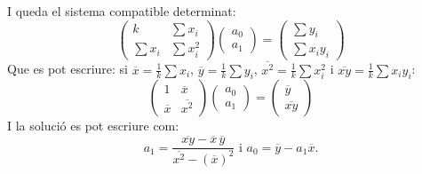 I queda el sistema compatible determinat:
\[
\begin{pmatrix}
k & \sum x_i \\ \sum x_i & \sum x_i^2 
\end{pmatrix}
\begin{pmatrix} a_0 \\ a_1 \end{pmatrix} = 
\begin{pmatrix} \sum y_i \\ \sum x_iy_i \end{pmatrix}
\]
Que es pot escriure: si $\overline x = \frac{1}{k} \sum x_i$, $\overline y=\frac{1}{k} \sum y_i$, $\overline {x^2}= \frac{1}{k} \sum x_i^2$ i $\overline {xy}=  \frac{1}{k} \sum x_iy_i$:
\[
\begin{pmatrix}
1 & \overline x \\ \overline x & \overline{x^2} 
\end{pmatrix}
\begin{pmatrix} a_0 \\ a_1 \end{pmatrix} = 
\begin{pmatrix}  \overline y \\ \overline{xy} \end{pmatrix}
\]
I la solució es pot escriure com:
\begin{equation}\label{eq:recta_reg}
a_1=\frac{\overline{xy} - \overline x \, \overline y}{\overline{x^2} - (\overline x)^2}
\text{ i } 
a_0= \overline y - a_1 \overline x .
\end{equation}

